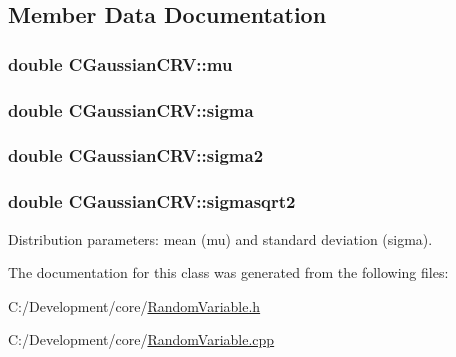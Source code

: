 \subsection{Member Data Documentation}
\hypertarget{class_c_gaussian_c_r_v_a513c769a9aa18c47a07713f50d1a0fd8}{
\subsubsection[{mu}]{\setlength{\rightskip}{0pt plus 5cm}double C\-Gaussian\-C\-R\-V\-::mu\hspace{0.3cm}{\ttfamily [private]}}}\label{class_c_gaussian_c_r_v_a513c769a9aa18c47a07713f50d1a0fd8}
\hypertarget{class_c_gaussian_c_r_v_a52b3c6dc416103587cfe07ffb7a914bd}{
\subsubsection[{sigma}]{\setlength{\rightskip}{0pt plus 5cm}double C\-Gaussian\-C\-R\-V\-::sigma\hspace{0.3cm}{\ttfamily [private]}}}\label{class_c_gaussian_c_r_v_a52b3c6dc416103587cfe07ffb7a914bd}
\hypertarget{class_c_gaussian_c_r_v_aa6e20834bdd6a1e47bdb5b39d8a2e23f}{
\subsubsection[{sigma2}]{\setlength{\rightskip}{0pt plus 5cm}double C\-Gaussian\-C\-R\-V\-::sigma2\hspace{0.3cm}{\ttfamily [private]}}}\label{class_c_gaussian_c_r_v_aa6e20834bdd6a1e47bdb5b39d8a2e23f}
\hypertarget{class_c_gaussian_c_r_v_a8959054f1098f9254c75d736245bb60b}{
\subsubsection[{sigmasqrt2}]{\setlength{\rightskip}{0pt plus 5cm}double C\-Gaussian\-C\-R\-V\-::sigmasqrt2\hspace{0.3cm}{\ttfamily [private]}}}\label{class_c_gaussian_c_r_v_a8959054f1098f9254c75d736245bb60b}
Distribution parameters\-: mean (mu) and standard deviation (sigma). 

The documentation for this class was generated from the following files\-:\begin{DoxyCompactItemize}
\item 
C\-:/\-Development/core/\hyperlink{_random_variable_8h}{Random\-Variable.\-h}\item 
C\-:/\-Development/core/\hyperlink{_random_variable_8cpp}{Random\-Variable.\-cpp}\end{DoxyCompactItemize}
